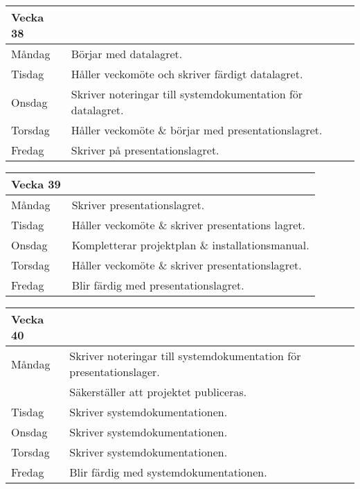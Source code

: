 \documentclass{liu_mall}
\begin{document}
\begin{table}[!h]
    \begin{tabularx}{\textwidth}{l|l}
        Vecka 38\\\hline
        Måndag  & Börjar med datalagret.\\
        Tisdag  & Håller veckomöte och skriver färdigt datalagret.\\
        Onsdag  & Skriver noteringar till systemdokumentation för datalagret.\\
        Torsdag & Håller veckomöte \& börjar med presentationslagret.\\ %
        Fredag  & Skriver på presentationslagret.\\ %
    \end{tabularx}
\end{table}

\begin{table}[!h]
    \begin{tabularx}{\textwidth}{l|l}
        Vecka 39\\\hline
        Måndag  & Skriver presentationslagret.\\ %
        Tisdag  & Håller veckomöte \& skriver presentations lagret.\\ %
        Onsdag  & Kompletterar projektplan \& installationsmanual.\\
        Torsdag & Håller veckomöte \& skriver presentationslagret.\\ %
        Fredag  & Blir färdig med presentationslagret.\\ %
    \end{tabularx}
\end{table}

\begin{table}[!h]
    \begin{tabularx}{\textwidth}{l|l}
        Vecka 40\\\hline
        Måndag  & Skriver noteringar till systemdokumentation för presentationslager.\\
                & Säkerställer att projektet publiceras.\\
        Tisdag  & Skriver systemdokumentationen.\\ %
        Onsdag  & Skriver systemdokumentationen.\\
        Torsdag & Skriver systemdokumentationen.\\ %
        Fredag  & Blir färdig med systemdokumentationen.\\ %
    \end{tabularx}
\end{table}
\end{document}
